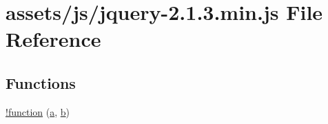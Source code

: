 \hypertarget{jquery-2_81_83_8min_8js}{}\section{assets/js/jquery-\/2.1.3.min.\+js File Reference}
\label{jquery-2_81_83_8min_8js}
\subsection*{Functions}
\begin{DoxyCompactItemize}
\item 
\hyperlink{jquery-2_81_83_8min_8js_a43f0b96ea8ec44ca20ba86809a785614}{!function} (\hyperlink{spin_8min_8js_a4075feadec68203bc249413df2e7348e}{a}, \hyperlink{spin_8min_8js_a09eee81a845307bd0e843e31209cf283}{b})
\item 

\end{DoxyCompactItemize}
